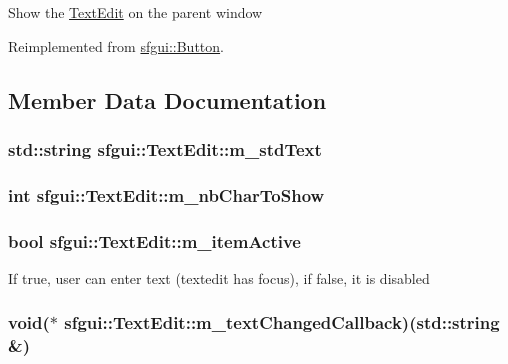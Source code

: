 Show the \hyperlink{classsfgui_1_1TextEdit}{TextEdit} on the parent window 

Reimplemented from \hyperlink{classsfgui_1_1Button_94dc6919349ff5ca9f334cce78afbe39}{sfgui::Button}.

\subsection{Member Data Documentation}
\hypertarget{classsfgui_1_1TextEdit_08de851a32aa8dd650e33dfcb376bfd8}{
\subsubsection[m\_\-stdText]{\setlength{\rightskip}{0pt plus 5cm}std::string {\bf sfgui::TextEdit::m\_\-stdText}}}
\label{classsfgui_1_1TextEdit_08de851a32aa8dd650e33dfcb376bfd8}


\hypertarget{classsfgui_1_1TextEdit_648ee4daef549d909bef251aa2f12b40}{
\subsubsection[m\_\-nbCharToShow]{\setlength{\rightskip}{0pt plus 5cm}int {\bf sfgui::TextEdit::m\_\-nbCharToShow}}}
\label{classsfgui_1_1TextEdit_648ee4daef549d909bef251aa2f12b40}


\hypertarget{classsfgui_1_1TextEdit_8ffa5546b2fd4901837b13a118f9beef}{
\subsubsection[m\_\-itemActive]{\setlength{\rightskip}{0pt plus 5cm}bool {\bf sfgui::TextEdit::m\_\-itemActive}}}
\label{classsfgui_1_1TextEdit_8ffa5546b2fd4901837b13a118f9beef}


If true, user can enter text (textedit has focus), if false, it is disabled \hypertarget{classsfgui_1_1TextEdit_a6d415ef1daf7f9fdf0dec3d71cb8eab}{
\subsubsection[m\_\-textChangedCallback]{\setlength{\rightskip}{0pt plus 5cm}void($\ast$ {\bf sfgui::TextEdit::m\_\-textChangedCallback})(std::string \&)}}
\label{classsfgui_1_1TextEdit_a6d415ef1daf7f9fdf0dec3d71cb8eab}


